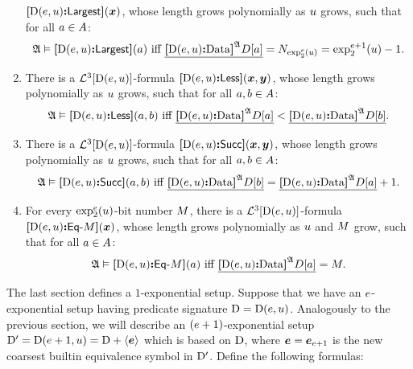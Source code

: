 \begin{definition}
\begin{enumerate}[label=E\arabic*]
  ${\bm{[}{\mathrm{D}}(e,u)\mathord{\bm{:}}\mathsf{Largest}\bm{]}}(\bm{x})$, whose length grows polynomially as $u$ grows,
  such that for all $a \in A$:
  \[
    \miff{
      \StrA \vDash \fLargest{\DS(\sze,\szu)}(\ea)}{
      \bdec{\Data{\DS(\sze,\szu)}\StrA\relD[\ea]} = \largtbit{\tetr\sze2\szu} =
      \tetr{\sze+1}2\szu-1}.
  \]
  \item\label{eset:6} There is a $\mathcal{L}^{3}[{\mathrm{D}}(e,u)]$-formula
  ${\bm{[}{\mathrm{D}}(e,u)\mathord{\bm{:}}\mathsf{Less}\bm{]}}(\bm{x},\bm{y})$, whose length grows polynomially as $u$
  grows, such that for all $a, b \in A$:
  \[
    \miff{
      \StrA \vDash \fLess{\DS(\sze,\szu)}(\ea,\eb)}{
      \bdec{\Data{\DS(\sze,\szu)}\StrA\relD[\ea]} <
      \bdec{\Data{\DS(\sze,\szu)}\StrA\relD[\eb]}}.
  \]
  \item\label{eset:7} There is a $\mathcal{L}^{3}[{\mathrm{D}}(e,u)]$-formula
  ${\bm{[}{\mathrm{D}}(e,u)\mathord{\bm{:}}\mathsf{Succ}\bm{]}}(\bm{x},\bm{y})$, whose length grows polynomially as $u$
  grows, such that for all $a, b \in A$:
  \[
    \miff{
      \StrA \vDash \fSucc{\DS(\sze,\szu)}(\ea,\eb)}{
      \bdec{\Data{\DS(\sze,\szu)}\StrA\relD[\eb]} =
      \bdec{\Data{\DS(\sze,\szu)}\StrA\relD[\ea]} + 1}.
  \]
  \item\label{eset:8} For every $\exp_{2}^{e}(u)$-bit number $M$, there is a
  $\mathcal{L}^{3}[{\mathrm{D}}(e,u)]$-formula
  ${\bm{[}{\mathrm{D}}(e,u)\mathord{\bm{:}}\mathsf{Eq}{\hbox{-}}M\bm{]}}(\bm{x})$, whose length grows polynomially as $u$
  and $M$ grow, such that for all $a \in  A$:
  \[
    \miff{
      \StrA \vDash \fDataA{\DS(\sze,\szu)}\nM(\ea)}{
      \bdec{\Data{\DS(\sze,\szu)}\StrA\relD[\ea]} = \nM}.
  \]
\end{enumerate}
\end{definition}
The last section defines a $1$-exponential setup.
Suppose that we have an $e$-exponential setup having predicate signature
${\mathrm{D}} = {\mathrm{D}}(e,u)$. Analogously to the previous section, we will describe an
$(e+1)$-exponential setup ${\mathrm{D'}} = {\mathrm{D}}(e+1,u) = {\mathrm{D}} + \left\langle \bm{e} \right\rangle$ which
is based on ${\mathrm{D}}$, where $\bm{e} = \bm{e}_{e+1}$ is the new coarsest builtin
equivalence symbol in ${\mathrm{D'}}$. Define the following formulas:
